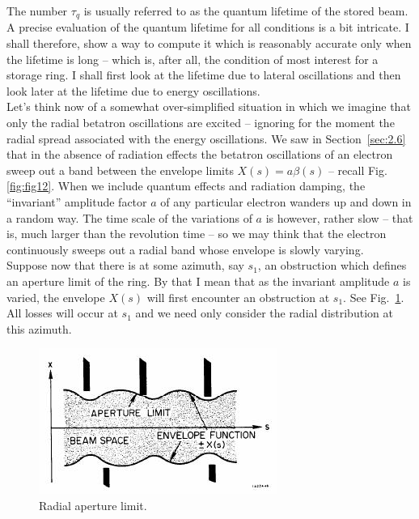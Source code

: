 The number $\tau_q$ is usually referred to as the quantum lifetime of the stored beam.\\
A precise evaluation of the quantum lifetime for all conditions is a bit intricate. I shall therefore, show a way to compute it which is reasonably accurate only when the lifetime is long -- which is, after all, the condition of most interest for a storage ring. I shall first look at the lifetime due to lateral oscillations and then look later at the lifetime due to energy oscillations.\\
Let's think now of a somewhat over-simplified situation in which we imagine that only the radial betatron oscillations are excited -- ignoring for the moment the radial spread associated with the energy oscillations. We saw in Section~\ref{sec:2.6} that in the absence of radiation effects the betatron oscillations of an electron sweep out a band between the envelope limits
 $X(s) = a\beta(s)$ -- recall Fig.\ref{fig:fig12}. When we include quantum effects and radiation
 damping, the ``invariant'' amplitude factor $a$ of any particular electron wanders up and down in a random way. The time scale of the variations of $a$ is however, rather slow -- that is, much
larger than the revolution time -- so we may think that the electron continuously sweeps out a radial band whose envelope is slowly varying.\\
Suppose now that there is at some azimuth, say $s_1$, an obstruction which defines an aperture
 limit of the ring. By that I mean that as the invariant amplitude $a$ is varied, the envelope $X(s)$ will first encounter an obstruction at $s_1$. See Fig.~\ref{fig:fig46}. All losses will occur at $s_1$ and we need only consider the radial distribution at this azimuth.
\begin{figure}[!htb]
	\centering
	\includegraphics[width=0.8\linewidth]{./Figuras/fig46.jpeg}
	\caption{Radial aperture limit.}
	\label{fig:fig46}
\end{figure}
